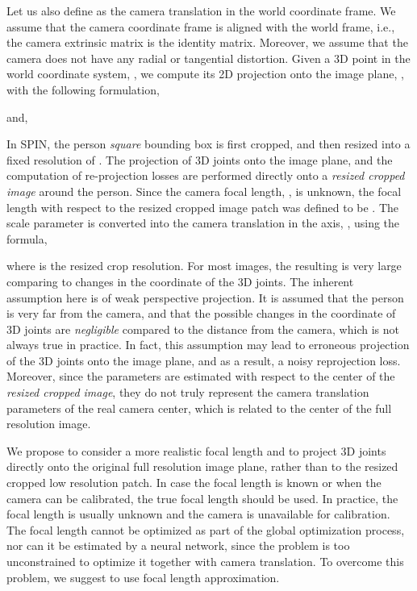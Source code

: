 \documentclass[runningheads]{llncs}
\begin{document}
Let us also define  as the camera translation in the world coordinate frame. We assume that the  camera coordinate frame is aligned with the world frame, i.e., the camera extrinsic matrix is the identity matrix. Moreover, we assume that the camera does not have any radial or tangential distortion. Given a 3D point in the world coordinate system, , we compute its 2D projection onto the image plane, , with the following formulation,

and,


In SPIN, the person \emph{square} bounding box is first cropped, and then resized into a fixed resolution of . The projection of 3D joints onto the image plane, and the computation of re-projection losses are performed directly onto a \emph{resized cropped image} around the person. Since the camera focal length, , is unknown, the focal length with respect to the resized cropped image patch was defined to be . The  scale  parameter  is converted into the camera translation in the  axis, , using the formula,

where   is the resized crop resolution. For most images, the resulting  is very large comparing to changes in the  coordinate of the 3D joints. The inherent assumption here is of weak perspective projection. It is assumed that the person is very far from the camera, and that the possible changes in the  coordinate of 3D joints are \emph{negligible} compared to the distance from the camera, which is not always true in practice. In fact, this assumption may lead to erroneous projection of the 3D joints onto the image plane, and as a result, a noisy reprojection loss.  Moreover, since the parameters  are estimated with respect to the center of the \emph{resized cropped image}, they do not truly represent the camera translation parameters of the real camera center, which is related to the center of the full resolution image.     

We propose to consider a more realistic focal length and to project 3D joints directly onto the original full resolution image plane, rather than to the resized cropped low resolution patch. In case the focal length is known or when the camera can be calibrated, the true focal length should be used. In practice, the focal length is usually unknown and the camera is unavailable for calibration. The focal length cannot be optimized as part of the global optimization process, nor can it be estimated by a neural network, since the problem is too unconstrained to optimize it together with camera translation. To overcome this problem, we suggest to use focal length approximation. 
\end{document}
